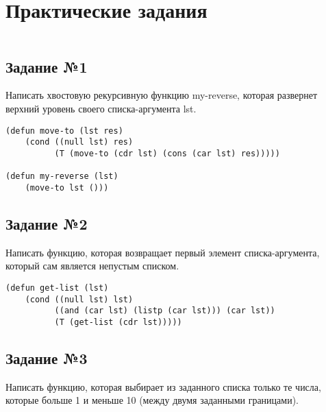 \chapter{Практические задания}

\vspace{4mm}
\hfill
\begin{minipage}{0.92\linewidth}
\begin{lstlisting}
\end{lstlisting}
\end{minipage}

\section{Задание №1}

Написать хвостовую рекурсивную функцию my-reverse, которая развернет верхний
уровень своего списка-аргумента lst.

\vspace{4mm}
\hfill
\begin{minipage}{0.92\linewidth}
\begin{lstlisting}
(defun move-to (lst res)
    (cond ((null lst) res)
          (T (move-to (cdr lst) (cons (car lst) res)))))

(defun my-reverse (lst)
    (move-to lst ()))
\end{lstlisting}
\end{minipage}

\section{Задание №2}

Написать функцию, которая возвращает первый элемент списка-аргумента, который
сам является непустым списком.

\vspace{4mm}
\begin{minipage}{0.92\linewidth}
\begin{lstlisting}
(defun get-list (lst)
    (cond ((null lst) lst)
          ((and (car lst) (listp (car lst))) (car lst))
          (T (get-list (cdr lst)))))
\end{lstlisting}
\end{minipage}

\section{Задание №3}

Написать функцию, которая выбирает из заданного списка только те числа,
которые больше 1 и меньше 10 (между двумя заданными границами).

